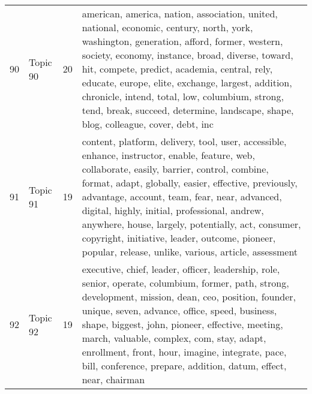 \begin{table}[ht]
{\begin{tabularx}{\textwidth}{llrX}
   90 & Topic 90 & 20 & american, america, nation, association, united, national, economic, century, north, york, washington, generation, afford, former, western, society, economy, instance, broad, diverse, toward, hit, compete, predict, academia, central, rely, educate, europe, elite, exchange, largest, addition, chronicle, intend, total, low, columbium, strong, tend, break, succeed, determine, landscape, shape, blog, colleague, cover, debt, inc \\ 
   91 & Topic 91 & 19 & content, platform, delivery, tool, user, accessible, enhance, instructor, enable, feature, web, collaborate, easily, barrier, control, combine, format, adapt, globally, easier, effective, previously, advantage, account, team, fear, near, advanced, digital, highly, initial, professional, andrew, anywhere, house, largely, potentially, act, consumer, copyright, initiative, leader, outcome, pioneer, popular, release, unlike, various, article, assessment \\ 
   92 & Topic 92 & 19 & executive, chief, leader, officer, leadership, role, senior, operate, columbium, former, path, strong, development, mission, dean, ceo, position, founder, unique, seven, advance, office, speed, business, shape, biggest, john, pioneer, effective, meeting, march, valuable, complex, com, stay, adapt, enrollment, front, hour, imagine, integrate, pace, bill, conference, prepare, addition, datum, effect, near, chairman \\ 
   \bottomrule
\end{tabularx}
}
\end{table}
